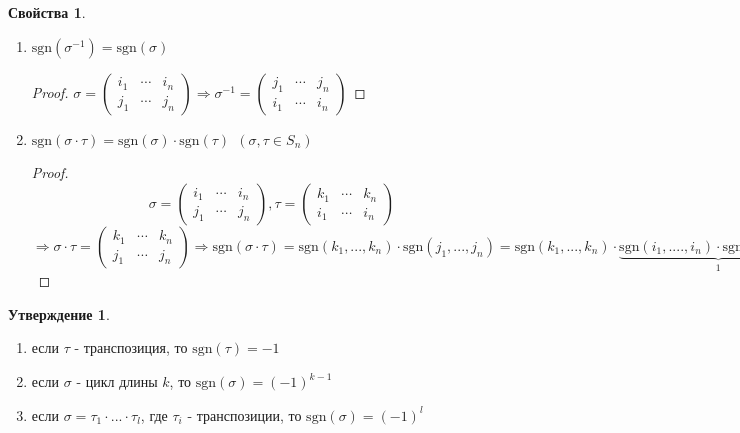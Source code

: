 \documentclass[a4paper, 12pt]{article}
\newcommand\tab[1][.5cm]{\hspace*{#1}}
\theoremstyle{definition}
\newtheorem*{subtheorem}{Утверждение}
\newtheorem*{properties}{Свойства}
\begin{document}
  \begin{properties} \tab 
    \begin{enumerate}
      \item $\textrm{sgn} (\sigma^{-1}) = \textrm{sgn} (\sigma)$
      \begin{proof}
        $\sigma = \begin{pmatrix}
          i_1 & \cdots & i_n \\
          j_1 & \cdots & j_n
        \end{pmatrix} \Longrightarrow \sigma^{-1} = \begin{pmatrix}
          j_1 & \cdots & j_n \\
          i_1 & \cdots & i_n  
        \end{pmatrix}$ 
      \end{proof}
      \item \label{propertie2} $\textrm{sgn} (\sigma \cdot \tau) = \textrm{sgn}(\sigma) \cdot \textrm{sgn}(\tau) \ \ (\sigma, \tau \in S_n)$ 
      \begin{proof}
        $$\sigma = \begin{pmatrix}
          i_1 & \cdots & i_n \\
          j_1 & \cdots & j_n
        \end{pmatrix}, 
        \tau = \begin{pmatrix}
        k_1 & \cdots & k_n \\
        i_1 & \cdots & i_n
        \end{pmatrix} $$ $ \Longrightarrow \sigma \cdot \tau = \begin{pmatrix}
          k_1 & \cdots & k_n \\
          j_1 & \cdots & j_n
        \end{pmatrix} \Longrightarrow \textrm{sgn}(\sigma \cdot \tau) = \textrm{sgn}(k_1,...,k_n) \cdot \textrm{sgn}(j_1,...,j_n) = \textrm{sgn}(k_1,...,k_n) \cdot \underbrace{\textrm{sgn}(i_1,....,i_n) \cdot \textrm{sgn}(i_1,....,i_n)}_{1}   \cdot \textrm{sgn} (j_1,...,j_n) = \textrm{sgn}(\sigma) \cdot \textrm{sgn} (\tau)$ 
      \end{proof} 
    \end{enumerate}
  \end{properties}
  \begin{subtheorem}\tab
    \begin{enumerate}
      \item \label{Ytv1} если $\tau$ - транспозиция, то $\textrm{sgn}(\tau) = -1$
      \item если $\sigma$ - цикл длины $k$, то $\textrm{sgn}(\sigma) = (-1)^{k-1}$
      \item \label{Ytv3}если $\sigma = \tau_1 \cdot ... \cdot \tau_l$, где $\tau_i$ - транспозиции, то $\textrm{sgn}(\sigma) = (-1)^l$      
    \end{enumerate}
  \end{subtheorem}
\end{document}
